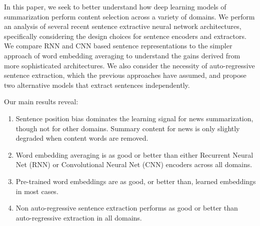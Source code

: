 In this paper, we seek to better understand how deep learning models of 
summarization perform content selection across a variety of domains.
We perform an analysis 
of several recent sentence extractive neural network architectures, 
specifically considering the design choices for sentence encoders and 
extractors. We compare RNN and CNN based sentence representations to the 
simpler approach of word embedding averaging to understand the gains 
derived from more sophisticated architectures.
We also consider the necessity of auto-regressive sentence extraction, 
which the previous approaches have assumed,
and propose two alternative models that extract sentences independently.

%
%
%
Our main results reveal:
\begin{enumerate}
\item Sentence position bias dominates the learning signal for news summarization, though not for
other domains. %
Summary content for news is only slightly degraded when content words
are removed. 
\item Word embedding averaging is as good or better than either Recurrent Neural Net (RNN) or Convolutional Neural Net (CNN) encoders across all domains.
\item Pre-trained word embeddings are as good, or better than, learned embeddings in most cases.
\item Non auto-regressive sentence extraction performs as good or better 
     than auto-regressive extraction in all
    domains.
    
\end{enumerate} 

